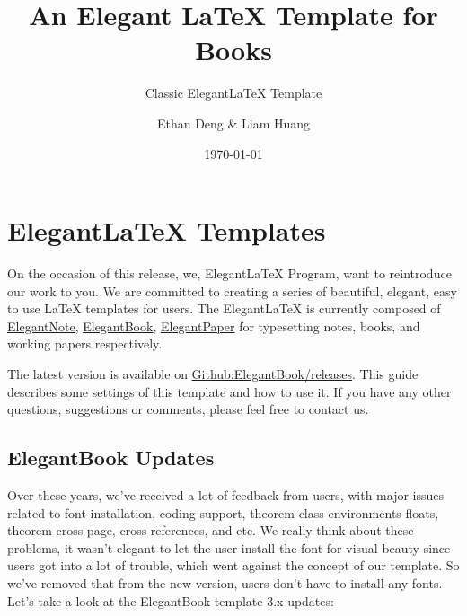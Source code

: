 \documentclass{elegantbook}
\title{An Elegant \LaTeX{} Template for Books}
\subtitle{Classic Elegant\LaTeX{} Template}
\author{Ethan Deng \& Liam Huang}
\institute{Elegant\LaTeX{} Program}
\date{\today}
\begin{document}
\maketitle
\tableofcontents
\clearpage
\thispagestyle{empty}
\mainmatter
\hypersetup{pageanchor=true}


\chapter{Elegant\LaTeX{} Templates}

On the occasion of this release, we, Elegant\LaTeX{} Program, want to reintroduce our work to you. We are committed to creating a series of beautiful, elegant, easy to use \LaTeX{} templates for users. The Elegant\LaTeX{} is currently composed of \href{https://github.com/ElegantLaTeX/ElegantNote}{ElegantNote}, \href{https://github.com/ElegantLaTeX/ElegantBook}{ElegantBook}, \href{https://github.com/ElegantLaTeX/ElegantPaper}{ElegantPaper} for typesetting notes, books, and working papers respectively. 

The latest version is available on \href{https://github.com/ElegantLaTeX/ElegantBook/releases}{Github:ElegantBook/releases}. This guide describes some settings of this template and how to use it. If you have any other questions, suggestions or comments, please feel free to contact us.


\section{ElegantBook Updates}
Over these years, we've received a lot of feedback from users, with major issues related to font installation, coding support, theorem class environments floats, theorem cross-page, cross-references, and etc. We really think about these problems, it wasn't elegant to let the user install the font for visual beauty since users got into a lot of trouble, which went against the concept of our template. So we've removed that from the new version, users don't have to install any fonts. Let's take a look at the ElegantBook template 3.x updates:
\end{document}
